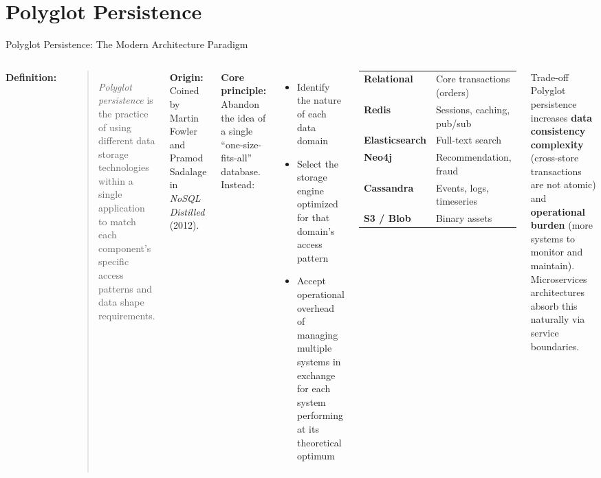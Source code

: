 \documentclass[aspectratio=169]{beamer}
\begin{document}
\section{Polyglot Persistence}

\begin{frame}{Polyglot Persistence: The Modern Architecture Paradigm}
  \begin{columns}[T]
      \small
      \textbf{Definition:}
      \begin{quote}
        \textit{Polyglot persistence} is the practice of using different data storage technologies within a single application to match each component's specific access patterns and data shape requirements.
      \end{quote}
      \vspace{0.2cm}
      \textbf{Origin:} Coined by Martin Fowler and Pramod Sadalage in \textit{NoSQL Distilled} (2012).
      \vspace{0.3cm}

      \textbf{Core principle:} Abandon the idea of a single ``one-size-fits-all'' database. Instead:
      \begin{itemize}\small
        \item Identify the nature of each data domain
        \item Select the storage engine optimized for that domain's access pattern
        \item Accept operational overhead of managing multiple systems in exchange for each system performing at its theoretical optimum
      \end{itemize}
      \begin{tcolorbox}[infobox, title=Common Polyglot Stack]
        \scriptsize
        \begin{tabular}{@{}ll@{}}
          \textbf{Relational} & Core transactions (orders) \\
          \textbf{Redis} & Sessions, caching, pub/sub \\
          \textbf{Elasticsearch} & Full-text search \\
          \textbf{Neo4j} & Recommendation, fraud \\
          \textbf{Cassandra} & Events, logs, timeseries \\
          \textbf{S3 / Blob} & Binary assets \\
        \end{tabular}
      \end{tcolorbox}
      \vspace{0.2cm}
      \begin{alertblock}{Trade-off}
        \small Polyglot persistence increases \textbf{data consistency complexity} (cross-store transactions are not atomic) and \textbf{operational burden} (more systems to monitor and maintain). Microservices architectures absorb this naturally via service boundaries.
      \end{alertblock}
  \end{columns}
\end{frame}
\end{document}
